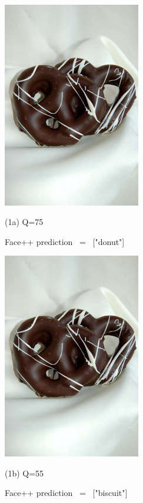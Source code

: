 \begin{figure}[htbp]
	\begin{minipage}{0.5\linewidth}
		\centerline{\includegraphics[width=6.0cm, trim=0 150 0 150, clip]{figures/donut_q75.jpeg}}
		\centerline{(1a) Q=75}
		\centerline{Face++ prediction \ = \ ["donut"]}
		\vspace{0.4cm}
	\end{minipage}
	\hfill
	\begin{minipage}{0.5\linewidth}
		\centerline{\includegraphics[width=6.0cm, trim=0 150 0 150, clip]{figures/donut_q55.jpeg}}
		\centerline{(1b) Q=55}
		\centerline{Face++ prediction \ = \ ["biscuit"]}
		\vspace{0.4cm}
	\end{minipage}

\end{figure}
